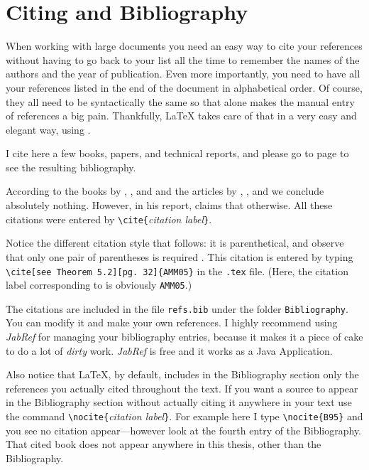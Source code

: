 \section{Citing and Bibliography}
When working with large documents you need an easy way to cite your
references without having to go back to your list all the time to
remember the names of the authors and the year of publication. Even
more importantly, you need to have all your references listed in the
end of the document in alphabetical order. Of course, they all need
to be syntactically the same so that alone makes the manual entry of
references a big pain. Thankfully, \LaTeX{} takes care of that in a
very easy and elegant way, using \BibTeX.

I cite here a few books, papers, and technical reports, and please
go to page \pageref{bib} to see the resulting bibliography.

According to the books by \cite{C75}, \cite{BR02}, and \cite{MR97}
and the articles by \cite{DG01}, \cite{BBM05}, and \cite{CFPS04} we
conclude absolutely nothing. However, in his report, \cite{A04}
claims that otherwise. All these citations were entered by \verb|\cite{|\emph{citation label}\verb|}|.
 
Notice the different citation style that follows: it is parenthetical, and observe that only one pair of parentheses is required \cite[see Theorem 5.2][pg. 32]{AMM05}. This citation is entered by typing \verb|\cite[see Theorem 5.2][pg. 32]{AMM05}| in the \verb|.tex| file. (Here, the citation label corresponding to \cite{AMM05} is obviously \verb|AMM05|.)


The citations are included in the file \verb|refs.bib| under the
folder \verb|Bibliography|. You can modify it and make your own
references. I highly recommend using \emph{JabRef} for managing your bibliography entries, because it makes it a piece of cake to do a lot of \emph{dirty} work. \emph{JabRef} is free and it works as a Java Application.

Also notice that \LaTeX{}, by default, includes in the Bibliography section only the references you actually cited throughout the text. If you want a source to appear in the Bibliography section without actually citing it anywhere in your text use the command \verb|\nocite{|\emph{citation label}\verb|}|. For example here I type \verb|\nocite{B95}| \nocite{B95} and you see no citation appear---however look at the fourth entry of the Bibliography. That cited book does not appear anywhere in this thesis, other than the Bibliography.

